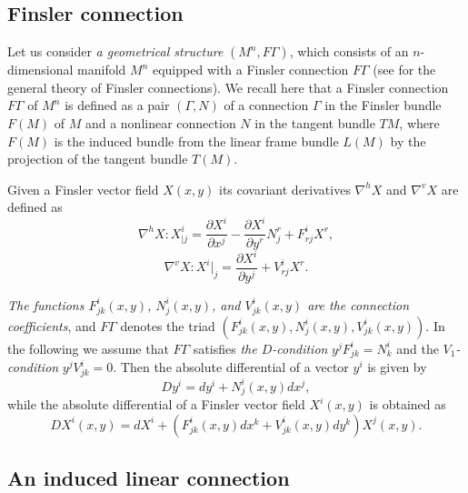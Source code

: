 \documentclass[aps,superscriptaddress, showpacs,preprintnumbers, superscriptaddress, nofootinbibt,twocolumn]{revtex4-2}
\begin{document}
\subsection{Finsler connection}

Let us consider {\it a geometrical structure} $\left( M^n,F\Gamma \right) $, which
consists of an $n$-dimensional manifold $M^n$ equipped with a Finsler
connection $F\Gamma $ (see \cite{Ing3} for the general theory of Finsler connections). We recall here that a  Finsler connection $F\Gamma $ of $M^n$ is defined as
a pair $(\Gamma ,N)$ of a connection $\Gamma $ in the Finsler bundle $F(M)$ of $M$ and a nonlinear
connection $N$ in the tangent bundle $TM$, where  $F(M)$ is the
induced bundle from the linear frame bundle $L(M)$ by the projection of the
tangent bundle $T(M)$.

Given a Finsler vector field $X(x,y)$ its covariant
derivatives $\nabla ^{h}X$ and $\nabla ^{v}X$ are defined as
\begin{equation}
\nabla ^{h}X:X_{|j}^{i}=\frac{\partial X^{i}}{\partial x^{j}}-\frac{\partial
X^{i}}{\partial y^{r}}N_{j}^{r}+F_{rj}^{i}X^{r},
\end{equation}
\begin{equation}
\nabla ^{v}X:X^{i}|_{j}=\frac{\partial X^{i}}{\partial y^{j}}%
+V_{rj}^{i}X^{r}.
\end{equation}

{\it The functions $F_{jk}^{i}(x,y)$, $N_{j}^{i}(x,y)$, and $V_{jk}^{i}(x,y)$ are
the connection coefficients}, and $F\Gamma $ denotes the triad $\left(
F_{jk}^{i}(x,y),N_{j}^{i}(x,y),V_{jk}^{i}(x,y)\right) $. In the following we
assume that $F\Gamma $ satisfies {\it the $D$-condition} $y^{j}F_{jk}^{i}=N_{k}^{i}
$ and the {\it $V_{1}$-condition} $y^{j}V_{jk}^{i}=0$. Then the absolute
differential of a vector $y^{i}$ is given by
\begin{equation}
Dy^{i}=dy^{i}+N_{j}^{i}\left( x,y\right) dx^{j},
\end{equation}%
while the absolute differential of a Finsler vector field $X^{i}(x,y)$ is
obtained as
\begin{equation}
DX^{i}(x,y)=dX^{i}+\left( F_{jk}^{i}(x,y)dx^{k}+V_{jk}^{i}(x,y)dy^{k}\right)
X^{j}(x,y).
\end{equation}

\subsection{An induced linear connection}
\end{document}
